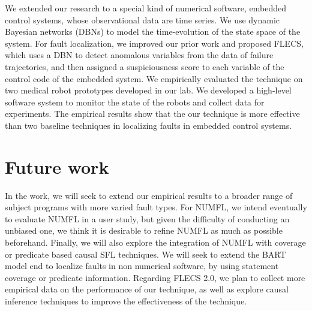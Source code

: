 We extended our research to a special kind of numerical software, embedded control systems, whose observational data are time series. We use dynamic Bayesian networks (DBNs) to model the time-evolution of the state space of the system. For fault localization, we improved our prior work and proposed FLECS, which uses a DBN to detect anomalous variables from the data of failure trajectories, and then assigned a suspiciousness score to each variable of the control code of the embedded system. We empirically evaluated the technique on two medical robot prototypes developed in our lab. We developed a high-level software system to monitor the state of the robots and collect data for experiments. The empirical results show that the our technique is more effective than two baseline techniques in localizing faults in embedded control systems.

\section{Future work}
In the work, we will seek to extend our empirical results to a broader range of subject programs with more varied fault types.  For NUMFL, we intend eventually to evaluate NUMFL in a user study, but given the difficulty of conducting an unbiased one, we think it is desirable to refine NUMFL as much as possible beforehand.  Finally, we will also explore the integration of NUMFL with coverage or predicate based causal SFL techniques. We will seek to extend the BART model end to localize faults in non numerical software, by using statement coverage or predicate information. Regarding FLECS 2.0, we plan to collect more empirical data on the performance of our technique, as well as explore causal inference techniques to improve the effectiveness of the technique. 









